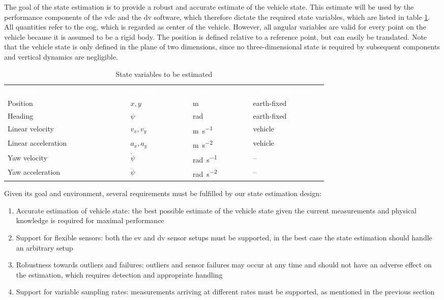 The goal of the state estimation is to provide a robust and accurate estimate of the vehicle state. This estimate will be used by the performance components of the \gls{vdc} and the \gls{dv} software, which therefore dictate the required state variables, which are listed in table \ref{tab:state-variables}. All quantities refer to the \gls{cog}, which is regarded as center of the vehicle. However, all angular variables are valid for every point on the vehicle because it is assumed to be a rigid body. The position is defined relative to a reference point, but can easily be translated. Note that the vehicle state is only defined in the plane of two dimensions, since no three-dimensional state is required by subsequent components and vertical dynamics are negligible.

\begin{table}
	\newcommand\heading[1]{\textcolor{white}{\textbf{#1}}}
	\renewcommand{\arraystretch}{1.2}
	\sffamily
	\centering
	\begin{tabularx}{\textwidth}{l l l X}
	\rowcolor{black} \heading{Variable~~~~~~~~~~~~~~~~~~~~~} & \heading{Symbol~~~~~~~} & \heading{Unit~~~~~~~~~} & \heading{Coordinate system} \vspace{2pt} \\
	Position & $x, y$ & \si{\meter} & earth-fixed \\
	Heading & $\psi$ & \si{\radian} & earth-fixed \\
	Linear velocity & $v_x, v_y$ & \si{\meter\per\second} & vehicle \\
	Linear acceleration & $a_x, a_y$ & \si{\meter\per\square\second} & vehicle \\
	Yaw velocity & $\dot{\psi}$ & \si{\radian\per\second} & -- \\
	Yaw acceleration & $\ddot{\psi}$ & \si{\radian\per\square\second} & -- \\
	\end{tabularx}
	\caption{State variables to be estimated}
	\label{tab:state-variables}
\end{table}

Given its goal and environment, several requirements must be fulfilled by our state estimation design:
\begin{enumerate}
\item Accurate estimation of vehicle state: the best possible estimate of the vehicle state given the current measurements and physical knowledge is required for maximal performance
\item Support for flexible sensors: both the \gls{ev} and \gls{dv} sensor setups must be supported, in the best case the state estimation should handle an arbitrary setup
\item Robustness towards outliers and failures: outliers and sensor failures may occur at any time and should not have an adverse effect on the estimation, which requires detection and appropriate handling
\item Support for variable sampling rates: measurements arriving at different rates must be supported, as mentioned in the previous section
\end{enumerate}

